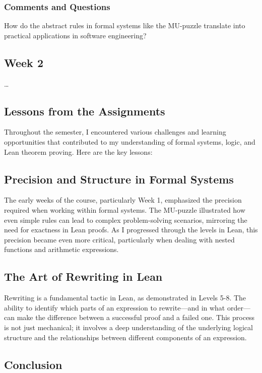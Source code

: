 \documentclass{article}
\theoremstyle{theorem}
\theoremstyle{definition}
\theoremstyle{remark}
\begin{document}
\subsubsection*{Comments and Questions}

How do the abstract rules in formal systems like the MU-puzzle translate into practical applications in software engineering? 

\subsection{Week 2}

\ldots

\subsection{Lessons from the Assignments}

Throughout the semester, I encountered various challenges and learning opportunities that contributed to my understanding of formal systems, logic, and Lean theorem proving. Here are the key lessons:

\subsection{Precision and Structure in Formal Systems}

The early weeks of the course, particularly Week 1, emphasized the precision required when working within formal systems. The MU-puzzle illustrated how even simple rules can lead to complex problem-solving scenarios, mirroring the need for exactness in Lean proofs. As I progressed through the levels in Lean, this precision became even more critical, particularly when dealing with nested functions and arithmetic expressions.

\subsection{The Art of Rewriting in Lean}

Rewriting is a fundamental tactic in Lean, as demonstrated in Levels 5-8. The ability to identify which parts of an expression to rewrite—and in what order—can make the difference between a successful proof and a failed one. This process is not just mechanical; it involves a deep understanding of the underlying logical structure and the relationships between different components of an expression.

\subsection{Conclusion}\label{conclusion}
\end{document}
